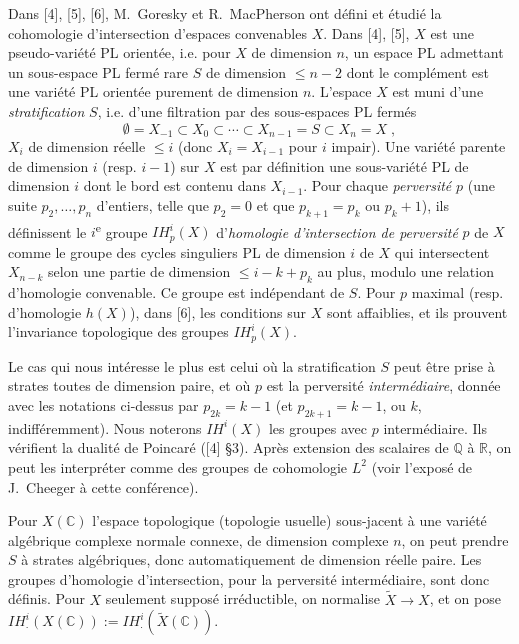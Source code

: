 \documentclass[12pt,a4paper]{article}
\theoremstyle{plain}
\theoremstyle{definition}
\theoremstyle{remark}
\newcommand{\IH}{\mathit{IH}}
\newcommand{\CC}{\mathbb{C}}
\newcommand{\QQ}{\mathbb{Q}}
\newcommand{\RR}{\mathbb{R}}
\begin{document}
\medskip

Dans [4], [5], [6], M.~Goresky et R.~MacPherson ont défini et étudié la cohomologie d'intersection d'espaces convenables $X$. Dans [4], [5], $X$ est une pseudo-variété PL orientée, i.e. pour $X$ de dimension $n$, un espace PL admettant un sous-espace PL fermé rare $S$ de dimension $\leq n{-}2$ dont le complément est une variété PL orientée purement de dimension $n$. L'espace $X$ est muni d'une \emph{stratification} $S$, i.e. d'une filtration par des sous-espaces PL fermés
\[
\emptyset = X_{-1} \subset X_{0} \subset \cdots \subset X_{n-1} = S \subset X_{n} = X\;,
\]
$X_{i}$ de dimension réelle $\leq i$ (donc $X_{i} = X_{i-1}$ pour $i$ impair). Une variété parente de dimension $i$ (resp. $i{-}1$) sur $X$ est par définition une sous-variété PL de dimension $i$ dont le bord est contenu dans $X_{i-1}$. Pour chaque \emph{perversité} $p$ (une suite $p_{2}, \dotsc, p_{n}$ d'entiers, telle que $p_{2} = 0$ et que $p_{k+1} = p_{k}$ ou $p_{k} {+} 1$), ils définissent le $i$\textsuperscript{e} groupe $\IH^{i}_{p}(X)$ d'\emph{homologie d'intersection de perversité} $p$ de $X$ comme le groupe des cycles singuliers PL de dimension $i$ de $X$ qui intersectent $X_{n-k}$ selon une partie de dimension $\leq i {-} k {+} p_{k}$ au plus, modulo une relation d'homologie convenable. Ce groupe est indépendant de $S$. Pour $p$ maximal (resp. d'homologie $h(X)$), dans [6], les conditions sur $X$ sont affaiblies, et ils prouvent l'invariance topologique des groupes $\IH^{i}_{p}(X)$.

\medskip

Le cas qui nous intéresse le plus est celui où la stratification $S$ peut être prise à strates toutes de dimension paire, et où $p$ est la perversité \emph{intermédiaire}, donnée avec les notations ci-dessus par $p_{2k} = k{-}1$ (et $p_{2k+1} = k-1$, ou $k$, indifféremment). Nous noterons $\IH^{i}(X)$ les groupes avec $p$ intermédiaire. Ils vérifient la dualité de Poincaré ([4] §3). Après extension des scalaires de $\QQ$ à $\RR$, on peut les interpréter comme des groupes de cohomologie $L^{2}$ (voir l'exposé de J.~Cheeger à cette conférence).

\medskip

Pour $X(\CC)$ l'espace topologique (topologie usuelle) sous-jacent à une variété algébrique complexe normale connexe, de dimension complexe $n$, on peut prendre $S$ à strates algébriques, donc automatiquement de dimension réelle paire. Les groupes d'homologie d'intersection, pour la perversité intermédiaire, sont donc définis. Pour $X$ seulement supposé irréductible, on normalise $\tilde{X} \to X$, et on pose $\IH^{i}_{\cdot}(X(\CC)) := \IH^{i}_{\cdot}(\tilde{X}(\CC))$.
\end{document}

